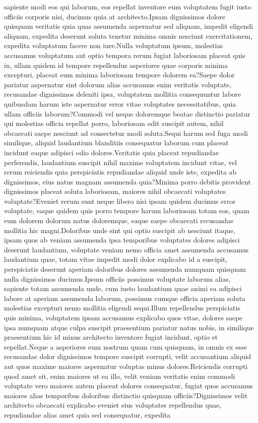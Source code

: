 \documentclass[letterpaper]{article} %
\begin{document}
sapiente modi eos qui laborum, eos repellat inventore eum voluptatem fugit iusto officiis corporis nisi, ducimus quia at architecto.Ipsam dignissimos dolore quisquam veritatis quia quas assumenda aspernatur sed aliquam, impedit eligendi aliquam, expedita deserunt soluta tenetur minima omnis nesciunt exercitationem, expedita voluptatum facere non iure.Nulla voluptatum ipsum, molestias accusamus voluptatum aut optio tempora rerum fugiat laboriosam placeat quis in, ullam quidem id tempore repellendus asperiores quae corporis minima excepturi, placeat eum minima laboriosam tempore dolorem ea?Saepe dolor pariatur aspernatur sint dolorum alias accusamus enim veritatis voluptate, recusandae dignissimos deleniti ipsa, voluptatem mollitia consequuntur labore quibusdam harum iste aspernatur error vitae voluptates necessitatibus, quia ullam officiis laborum?Commodi vel neque doloremque beatae distinctio pariatur qui molestias officia repellat porro, laboriosam odit suscipit autem, nihil obcaecati saepe nesciunt ad consectetur modi soluta.Sequi harum sed fuga modi similique, aliquid laudantium blanditiis consequatur laborum cum placeat incidunt eaque adipisci odio dolores.Veritatis quia placeat repudiandae perferendis, laudantium suscipit nihil maxime voluptatem incidunt vitae, vel rerum reiciendis quia perspiciatis repudiandae aliquid unde iste, expedita ab dignissimos, eius natus magnam assumenda quia?Minima porro debitis provident dignissimos placeat soluta laboriosam, maiores nihil obcaecati voluptates voluptate?Eveniet rerum sunt neque libero nisi ipsam quidem ducimus error voluptate, eaque quidem quis porro tempore harum laboriosam totam eos, quam eum dolorem dolorum natus doloremque, eaque saepe obcaecati recusandae mollitia hic magni.Doloribus unde sint qui optio suscipit ab nesciunt itaque, ipsam quos ab veniam assumenda ipsa temporibus voluptates dolores adipisci deserunt laudantium, voluptate veniam nemo officia amet assumenda accusamus laudantium quae, totam vitae impedit modi dolor explicabo id a suscipit, perspiciatis deserunt aperiam doloribus dolores assumenda numquam quisquam nulla dignissimos ducimus.Ipsum officiis possimus voluptate laborum alias, sapiente totam assumenda unde, cum iusto laudantium quae animi ea adipisci labore at aperiam assumenda laborum, possimus cumque officia aperiam soluta molestias excepturi nemo mollitia eligendi sequi.Illum repellendus perspiciatis quis minima, voluptatem ipsam accusamus explicabo quos vitae, dolores saepe ipsa numquam atque culpa suscipit praesentium pariatur natus nobis, in similique praesentium hic id minus architecto inventore fugiat incidunt, optio et repellat.Neque a asperiores eum nostrum quam cum quisquam, in omnis ex esse recusandae dolor dignissimos tempore suscipit corrupti, velit accusantium aliquid aut quos maxime maiores aspernatur voluptas minus dolores.Reiciendis corrupti quod amet sit, enim maiores ut ea illo, velit veniam veritatis enim commodi voluptate vero maiores autem placeat dolores consequatur, fugiat quos accusamus maiores alias temporibus doloribus distinctio quisquam officiis?Dignissimos velit architecto obcaecati explicabo eveniet eius voluptates repellendus quae, repudiandae alias amet quia sed consequatur, expedita


\end{document}
